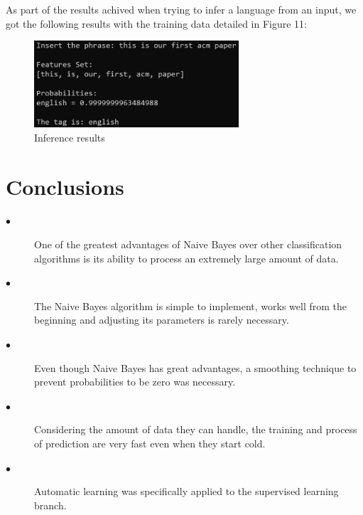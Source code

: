 \documentclass[sigconf,12pt,review=false,natbib=false]{acmart}
\begin{document}
As part of the results achived when trying to infer a language from an input, we got the following results with the
training data detailed in Figure 11: \\

\begin{figure}[h!]
    \centering
    \includegraphics[width=3in]{inference}
    \caption{Inference results}
    \label{fig:inference}
\end{figure}

\section{Conclusions}

\begin{description}

    \item[$\bullet$] One of the greatest advantages of Naive Bayes over other classification algorithms is its ability
      to process an extremely large amount of data. \\

  \item[$\bullet$] The Naive Bayes algorithm is simple to implement, works well from the beginning and adjusting its
      parameters is rarely necessary. \\

  \item[$\bullet$] Even though Naive Bayes has great advantages, a smoothing technique to prevent probabilities to be
      zero was necessary. \\

  \item[$\bullet$] Considering the amount of data they can handle, the training and process of prediction are very
      fast even when they start cold. \\

  \item[$\bullet$] Automatic learning was specifically applied to the supervised learning branch. \\

\end{description}

\nocite{*}
\printbibliography
\end{document}
